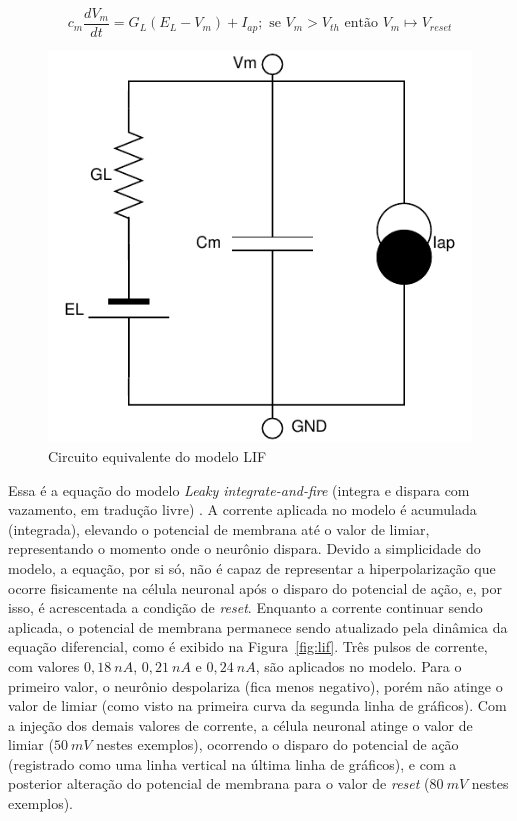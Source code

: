 \begin{equation}\label{eq:lif}
	c_m\frac{dV_m}{dt} = G_L(E_L-V_m)+I_{ap}; \text{ se } V_m > V_{th} \text{ então } V_m\mapsto V_{reset}
\end{equation}
\begin{figure}[htb!]
	\centering
	\caption{Circuito equivalente do modelo LIF}
	\label{fig:circuitolif}
	\includegraphics[width=0.5\linewidth]{figs/circuito_lif}
\end{figure}
Essa é a equação do modelo \textit{Leaky integrate-and-fire} (integra e dispara com vazamento, em tradução livre) \cite{lapicque_recherches_1907}. A corrente aplicada no modelo é acumulada (integrada), elevando o potencial de membrana até o valor de limiar, representando o momento onde o neurônio dispara. Devido a simplicidade do modelo, a equação, por si só, não é capaz de representar a hiperpolarização que ocorre fisicamente na célula neuronal após o disparo do potencial de ação, e, por isso, é acrescentada a condição de \textit{reset}. Enquanto a corrente continuar sendo aplicada, o potencial de membrana permanece sendo atualizado pela dinâmica da equação diferencial, como é exibido na Figura~\ref{fig:lif}. Três pulsos de corrente, com valores $0,18\ nA$, $0,21\ nA$ e $0,24\ nA$, são aplicados no modelo. Para o primeiro valor, o neurônio despolariza (fica menos negativo), porém não atinge o valor de limiar (como visto na primeira curva da segunda linha de gráficos). Com a injeção dos demais valores de corrente, a célula neuronal atinge o valor de limiar ($50\ mV$ nestes exemplos), ocorrendo o disparo do potencial de ação (registrado como uma linha vertical na última linha de gráficos), e com a posterior alteração do potencial de membrana para o valor de \textit{reset} ($80\ mV$ nestes exemplos).

